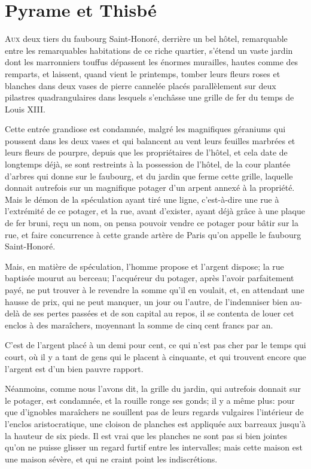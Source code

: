 \chapter{Pyrame et Thisbé}

\lettrine{A}{ux} deux tiers du faubourg Saint-Honoré, derrière un bel hôtel, remarquable entre les remarquables habitations de ce riche quartier, s'étend un vaste jardin dont les marronniers touffus dépassent les énormes murailles, hautes comme des remparts, et laissent, quand vient le printemps, tomber leurs fleurs roses et blanches dans deux vases de pierre cannelée placés parallèlement sur deux pilastres quadrangulaires dans lesquels s'enchâsse une grille de fer du temps de Louis XIII. 

Cette entrée grandiose est condamnée, malgré les magnifiques géraniums qui poussent dans les deux vases et qui balancent au vent leurs feuilles marbrées et leurs fleurs de pourpre, depuis que les propriétaires de l'hôtel, et cela date de longtemps déjà, se sont restreints à la possession de l'hôtel, de la cour plantée d'arbres qui donne sur le faubourg, et du jardin que ferme cette grille, laquelle donnait autrefois sur un magnifique potager d'un arpent annexé à la propriété. Mais le démon de la spéculation ayant tiré une ligne, c'est-à-dire une rue à l'extrémité de ce potager, et la rue, avant d'exister, ayant déjà grâce à une plaque de fer bruni, reçu un nom, on pensa pouvoir vendre ce potager pour bâtir sur la rue, et faire concurrence à cette grande artère de Paris qu'on appelle le faubourg Saint-Honoré. 

Mais, en matière de spéculation, l'homme propose et l'argent dispose; la rue baptisée mourut au berceau; l'acquéreur du potager, après l'avoir parfaitement payé, ne put trouver à le revendre la somme qu'il en voulait, et, en attendant une hausse de prix, qui ne peut manquer, un jour ou l'autre, de l'indemniser bien au-delà de ses pertes passées et de son capital au repos, il se contenta de louer cet enclos à des maraîchers, moyennant la somme de cinq cent francs par an. 

C'est de l'argent placé à un demi pour cent, ce qui n'est pas cher par le temps qui court, où il y a tant de gens qui le placent à cinquante, et qui trouvent encore que l'argent est d'un bien pauvre rapport. 

Néanmoins, comme nous l'avons dit, la grille du jardin, qui autrefois donnait sur le potager, est condamnée, et la rouille ronge ses gonds; il y a même plus: pour que d'ignobles maraîchers ne souillent pas de leurs regards vulgaires l'intérieur de l'enclos aristocratique, une cloison de planches est appliquée aux barreaux jusqu'à la hauteur de six pieds. Il est vrai que les planches ne sont pas si bien jointes qu'on ne puisse glisser un regard furtif entre les intervalles; mais cette maison est une maison sévère, et qui ne craint point les indiscrétions. 

